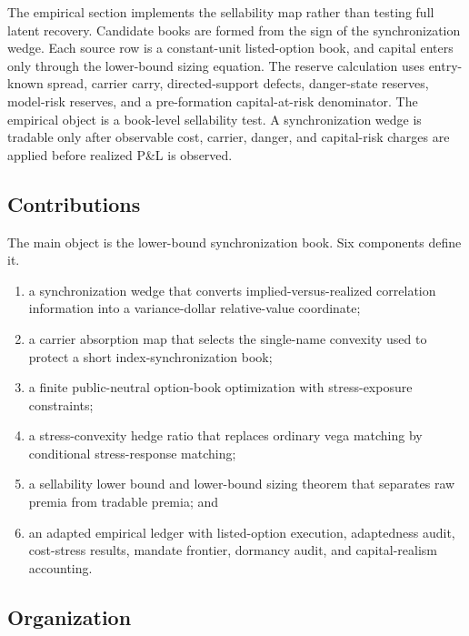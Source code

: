 \documentclass[11pt,a4paper]{amsart}
\theoremstyle{plain}
\theoremstyle{definition}
\theoremstyle{remark}
\begin{document}
The empirical section implements the sellability map rather than testing full latent recovery.
Candidate books are formed from the sign of the synchronization wedge.  Each source row is a
constant-unit listed-option book, and capital enters only through the lower-bound sizing equation.
The reserve calculation uses entry-known spread, carrier carry, directed-support defects,
danger-state reserves, model-risk reserves, and a pre-formation capital-at-risk denominator.  The
empirical object is a book-level sellability test.  A synchronization wedge is tradable only after
observable cost, carrier, danger, and capital-risk charges are applied before realized P\&L is
observed.

\subsection*{Contributions}

The main object is the lower-bound synchronization book.  Six components define it.

\begin{enumerate}[leftmargin=2em]
\item a synchronization wedge that converts implied-versus-realized correlation information into a
variance-dollar relative-value coordinate;
\item a carrier absorption map that selects the single-name convexity used to protect a short
index-synchronization book;
\item a finite public-neutral option-book optimization with stress-exposure constraints;
\item a stress-convexity hedge ratio that replaces ordinary vega matching by conditional
stress-response matching;
\item a sellability lower bound and lower-bound sizing theorem that separates raw premia from
tradable premia; and
\item an adapted empirical ledger with listed-option execution, adaptedness audit, cost-stress
results, mandate frontier, dormancy audit, and capital-realism accounting.
\end{enumerate}

\subsection*{Organization}
\end{document}
